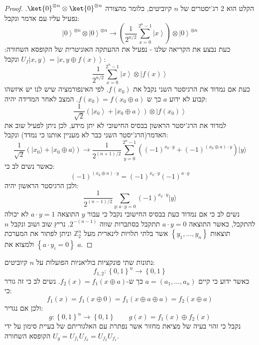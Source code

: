 \documentclass{tstextbook}
\begin{document}
\begin{proof}
הקלט הוא 2 רג'יסטרים של \(n\) קיוביטים, כלומר מהצורה \(\ket{0}^{\otimes n}\otimes \ket{0}^{\otimes n}\). נפעיל עליו עם אדמר ונקבל:
$$\left|0\right\rangle^{\otimes n}\otimes\left|0\right\rangle^{\otimes n}\longrightarrow\left({\frac{1}{2^{n/2}}}\sum_{x=0}^{2^{n}-1}\left|x\right\rangle\right)\otimes\left|0\right\rangle^{\otimes n}$$
כעת נבצע את הקריאה שלנו - נפעיל את ההעתקה האוניטרית של הקופסא השחורה: \(U_{f}\left|x,y\right\rangle=\left|x,y\oplus f\left(x\right)\right\rangle\) ונקבל:
$${\frac{1}{2^{n/2}}}\sum_{x=0}^{2^{n}-1}\left|x\right\rangle\otimes\left|f\left(x\right)\right\rangle$$
כעת אם נמדוד את הרגיסטר השני נקבל את \(f(x_{0})\). לפי האינפורמציה שיש לנו יש איזשהו קבוע לא ידוע \(a\) כך ש \(f(x_{0})=f\left( x_{0}\oplus a \right)\). המצב לאחר המדידה יהיה:
$${\frac{1}{\sqrt{2}}}\left(\left|x_{0}\right\rangle+\left|x_{0}\oplus a\right\rangle\right)\otimes\left|f\left(x_{0}\right)\right\rangle$$
למדוד את הרג'יסטר הראשון בבסיס החישובי לא יתן מידע, לכן ניתן לפעיל שוב את האדמר(הרג'יסטר השני כבר לא מעניין אותנו כי נמדד) ונקבל:
$${\frac{1}{\sqrt{2}}}\left(|x_{0}\rangle+|x_{0}\oplus a\rangle\right)\longrightarrow{\frac{1}{2^{(n+1)/2}}}\sum_{y=0}^{2^{n}-1}\left(\left(-1\right)^{x_{0}\cdot y}+\left(-1\right)^{(x_{0}\oplus a)\cdot y}\right)|y\rangle$$
כאשר נשים לב כי:
$$(-1)^{(x_{0}\oplus a)\cdot y}=(-1)^{x_{0}\cdot y}\left(-1\right)^{a\cdot y}$$
ולכן הרגיסטר הראשון יהיה:
$${\frac{1}{2^{(n-1)/2}}}\sum_{y:a\cdot y=0}\left(-1\right)^{x_{0}\cdot y}|y\rangle$$
נשים לב כי אם נמדוד כעת בבסיס החישובי נקבל כי עבור \(y\) התוצאה \(a\cdot y = 1\) לא יכולה להתקבל, כאשר התוצאה \(a\cdot y = 0\) תתקבל בסתברות שווה \(2^{-(n-1)}\). נריץ שוב ושוב ונקבל \(n\) תוצאות \(\left\{  y_{1},\dots,y_{n}  \right\}\)  אשר בלתי תלויות לינארית מעל \(\mathbb{Z}_{2}^{n}\) וניתן לפתור את המערכת \(\left\{  a\cdot y_{i}=0  \right\}\) ולמצוא את \(a\).

\end{proof}
\begin{example}
נתונות שתי פונקציות בוליאניות הפועלות על \(n\) קיוביטים:
$$f_{1,2}:\left\{0,1\right\}^{n}\longrightarrow\left\{0,1\right\}$$
כאשר ידוע כי קיים \(a=\left( a_{1},\dots, a_{n} \right)\) כך ש-\(f_{2}(x)=f_{1}\left( x\oplus a \right)\). נשים לב כי זה גורר כי:
$$f_{1}(x)=f_{1}\left( x\oplus 0 \right)=f_{1}\left( x\oplus a\oplus a \right)=f_{2}\left( x\oplus a \right)$$
ולכן אם נגדיר:
$$g:\left\{0,1\right\}^{n}\longrightarrow\left\{0,1\right\}\qquad g\left(x\right)=f_{1}\left(x\right)\oplus f_{2}\left(x\right)$$
נקבל כי זהוי בעיה של מציאת מחזור אשר נפתרת עם האלגוריתם של בעיית סימון על ידי הקופסא השחורה \(U_{g}=U_{f_{1}}U_{f_{2}}=U_{f_{2}}U_{f_{1}}\).

\end{example}
\end{document}
